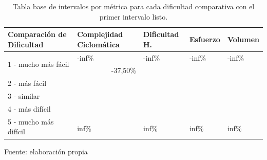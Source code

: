 \documentclass[letterpaper,12pt]{article}
\begin{document}
\begin{enumerate}
        \begin{table}[H]
          \centering
          \begin{tabular}{|l|l|l|l|l|}
            \hline
            \textbf{Comparación de Dificultad}     & \textbf{Complejidad Ciclomática} & \textbf{Dificultad H.} & \textbf{Esfuerzo} & \textbf{Volumen} \\ \hline
            \multirow{2}{*}{1 - mucho más fácil}   & -inf\%                           & -inf\%                 & -inf\%            & -inf\%           \\ \cline{2-5}
                                                   & \multicolumn{1}{r|}{-37,50\%}    &                        &                   &                  \\ \hline
            \multirow{2}{*}{2 - más fácil}         & \multicolumn{1}{r|}{}            &                        &                   &                  \\ \cline{2-5}
                                                   & \multicolumn{1}{r|}{}            &                        &                   &                  \\ \hline
            \multirow{2}{*}{3 - similar}           & \multicolumn{1}{r|}{}            &                        &                   &                  \\ \cline{2-5}
                                                   & \multicolumn{1}{r|}{}            &                        &                   &                  \\ \hline
            \multirow{2}{*}{4 - más difícil}       &                                  &                        &                   &                  \\ \cline{2-5}
                                                   &                                  &                        &                   &                  \\ \hline
            \multirow{2}{*}{5 - mucho más difícil} &                                  &                        &                   &                  \\ \cline{2-5}
                                                   & inf\%                            & inf\%                  & inf\%             & inf\%            \\ \hline
          \end{tabular}
          \caption{Tabla base de intervalos por métrica para cada dificultad comparativa con el primer intervalo listo.} Fuente: elaboración propia

\end{table}
\end{enumerate}
\end{document}
